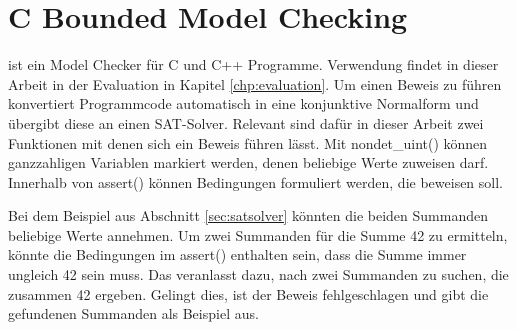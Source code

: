 \section{C Bounded Model Checking}
\label{sec:cbmc}

 ist ein Model Checker für C und C++ Programme. Verwendung findet  in dieser Arbeit in der Evaluation in Kapitel \ref{chp:evaluation}.
Um einen Beweis zu führen konvertiert  Programmcode automatisch in eine konjunktive Normalform und übergibt diese an einen SAT-Solver.
Relevant sind dafür in dieser Arbeit zwei Funktionen mit denen sich ein Beweis führen lässt. Mit nondet\_uint() können ganzzahligen Variablen markiert
werden, denen  beliebige Werte zuweisen darf. Innerhalb von assert() können Bedingungen formuliert werden, die  beweisen soll.

Bei dem Beispiel aus Abschnitt \ref{sec:satsolver} könnten die beiden Summanden beliebige Werte annehmen. Um zwei Summanden für die Summe 42 zu ermitteln,
könnte die Bedingungen im assert() enthalten sein, dass die Summe immer ungleich 42 sein muss. Das veranlasst  dazu, nach zwei Summanden zu suchen,
die zusammen 42 ergeben. Gelingt dies, ist der Beweis fehlgeschlagen und  gibt die gefundenen Summanden als Beispiel aus.